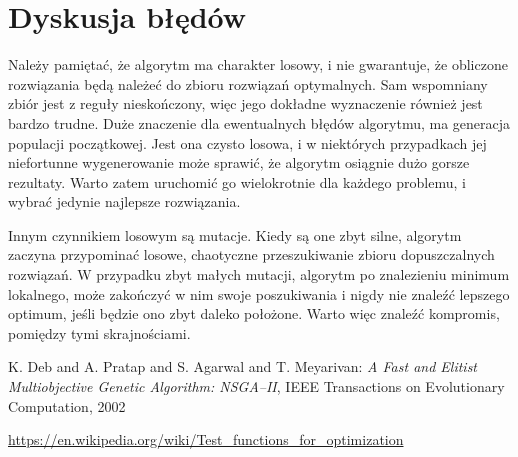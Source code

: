 \documentclass[11pt,a4paper]{article}
\begin{document}
\section{Dyskusja błędów}

Należy pamiętać, że algorytm ma charakter losowy, i nie gwarantuje, że obliczone rozwiązania będą należeć do zbioru rozwiązań optymalnych. Sam wspomniany zbiór jest z reguły nieskończony, więc jego dokładne wyznaczenie również jest bardzo trudne. Duże znaczenie dla ewentualnych błędów algorytmu, ma generacja populacji początkowej. Jest ona czysto losowa, i w niektórych przypadkach jej niefortunne wygenerowanie może sprawić, że algorytm osiągnie dużo gorsze rezultaty. Warto zatem uruchomić go wielokrotnie dla każdego problemu, i wybrać jedynie najlepsze rozwiązania. 

Innym czynnikiem losowym są mutacje. Kiedy są one zbyt silne, algorytm zaczyna przypominać losowe, chaotyczne przeszukiwanie zbioru dopuszczalnych rozwiązań. W przypadku zbyt małych mutacji, algorytm po znalezieniu minimum lokalnego, może zakończyć w nim swoje poszukiwania i nigdy nie znaleźć lepszego optimum, jeśli będzie ono zbyt daleko położone. Warto więc znaleźć kompromis, pomiędzy tymi skrajnościami. 

\begin{thebibliography}{9}
 K. Deb and A. Pratap and S. Agarwal and T. Meyarivan:
\emph{A Fast and Elitist Multiobjective Genetic Algorithm: NSGA–II},
IEEE Transactions on Evolutionary Computation, 2002

 \url{https://en.wikipedia.org/wiki/Test_functions_for_optimization}

\end{thebibliography}
\end{document}
